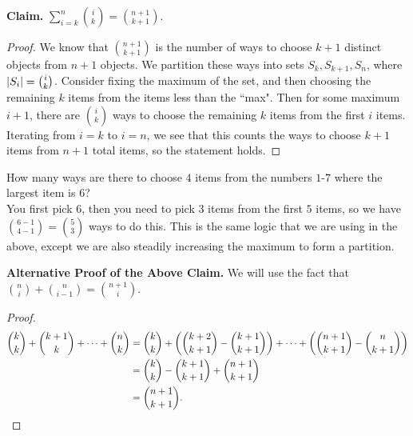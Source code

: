 \documentclass[class=article, crop=false]{standalone}
\begin{document}
  \textbf{Claim.} $\sum_{i=k}^{n}\binom{i}{k}=\binom{n+1}{k+1}$.
  \begin{proof}
    We know that $\binom{n+1}{k+1}$ is the number of ways to choose $k+1$ distinct objects from $n+1$ objects. We partition these ways into sets $S_k, S_{k+1}, S_n$, where $\left\lvert S_i \right\rvert = \binom{i}{k}$. Consider fixing the maximum of the set, and then choosing the remaining $k$ items from the items less than the ``max". Then for some maximum $i+1$, there are $\binom{i}{k}$ ways to choose the remaining $k$ items from the first $i$ items. Iterating from $i=k$ to $i=n$, we see that this counts the ways to choose $k+1$ items from $n+1$ total items, so the statement holds.
  \end{proof}
  \begin{example}{}
    How many ways are there to choose $4$ items from the numbers $1$-$7$ where the largest item is $6$? \\[10pt]
    You first pick $6$, then you need to pick $3$ items from the first $5$ items, so we have $\binom{6-1}{4-1} = \binom{5}{3}$ ways to do this. This is the same logic that we are using in the above, except we are also steadily increasing the maximum to form a partition.
  \end{example}
  \textbf{Alternative Proof of the Above Claim.} We will use the fact that $\binom{n}{i}+\binom{n}{i-1}=\binom{n+1}{i}$.
  \begin{proof}
    \begin{align*}
      \binom{k}{k}+\binom{k+1}{k}+ \dotsb+\binom{n}{k} &= \binom{k}{k}+\left( \binom{k+2}{k+1}-\binom{k+1}{k+1} \right)+ \dotsb+\left( \binom{n+1}{k+1}-\binom{n}{k+1} \right) \\
                                                       &= \binom{k}{k} - \binom{k+1}{k+1} + \binom{n+1}{k+1} \\
                                                       &= \binom{n+1}{k+1}.
    \end{align*}
  \end{proof}
\end{document}
